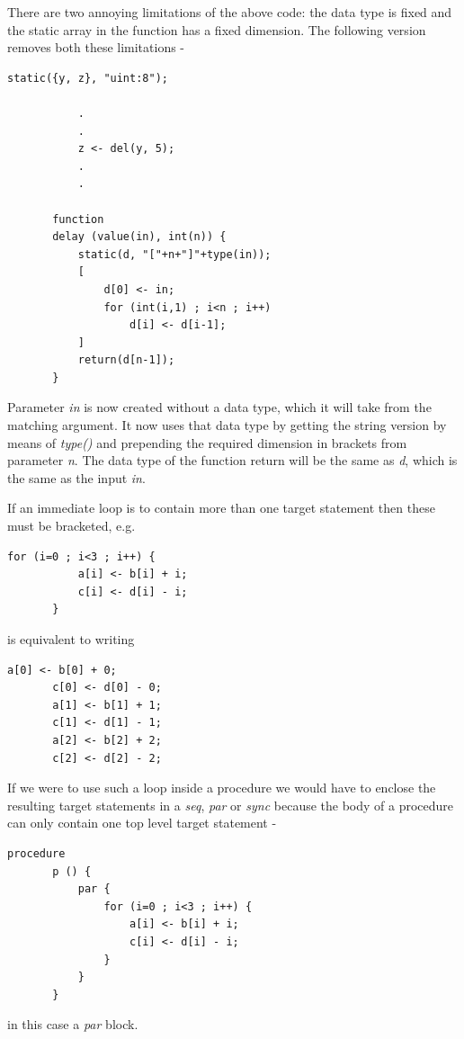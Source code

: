     There are two annoying limitations of the above code: the data type is
    fixed and the static array in the function has a fixed dimension. The
    following version removes both these limitations -
    \begin{lstlisting}[gobble=4, language=threepl]
           static({y, z}, "uint:8");

           .
           .
           z <- del(y, 5);
           .
           .

       function
       delay (value(in), int(n)) {
           static(d, "["+n+"]"+type(in));
           [
               d[0] <- in;
               for (int(i,1) ; i<n ; i++)
                   d[i] <- d[i-1];
           ]
           return(d[n-1]);
       }
    \end{lstlisting}
    Parameter {\em in} is now created without a data type, which it will
    take from the matching argument. It now uses that data type by getting the
    string version by means of {\em type()} and prepending the required
    dimension in brackets from parameter {\em n}. The data type of the
    function return will be the same as {\em d}, which is the same as the
    input {\em in}.

    If an immediate loop is to contain more than one target statement
    then these must be bracketed, e.g.
    \begin{lstlisting}[gobble=4, language=threepl]
       for (i=0 ; i<3 ; i++) {
           a[i] <- b[i] + i;
           c[i] <- d[i] - i;
       }
    \end{lstlisting}
    is equivalent to writing
    \begin{lstlisting}[gobble=4, language=threepl]
       a[0] <- b[0] + 0;
       c[0] <- d[0] - 0;
       a[1] <- b[1] + 1;
       c[1] <- d[1] - 1;
       a[2] <- b[2] + 2;
       c[2] <- d[2] - 2;
    \end{lstlisting}    

    If we were to use such a loop inside a procedure we would have to enclose
    the resulting target statements in a {\em seq}, {\em par} or {\em sync}
    because the body of a procedure can only contain one top level target
    statement -
    \begin{lstlisting}[gobble=4, language=threepl]
       procedure
       p () {
           par {
               for (i=0 ; i<3 ; i++) {
                   a[i] <- b[i] + i;
                   c[i] <- d[i] - i;
               }
           }
       }
    \end{lstlisting}
    in this case a {\em par} block.

